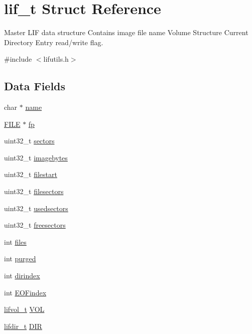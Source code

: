 \hypertarget{structlif__t}{}\section{lif\+\_\+t Struct Reference}
\label{structlif__t}


Master L\+IF data structure Contains image file name Volume Structure Current Directory Entry read/write flag.  




{\ttfamily \#include $<$lifutils.\+h$>$}

\subsection*{Data Fields}
\begin{DoxyCompactItemize}
\item 
char $\ast$ \hyperlink{structlif__t_ae6b943f3c26005fc375169960e9049f7}{name}
\item 
\hyperlink{posix_8h_aed4dabeb9f7c518ded42f930a04abce8}{F\+I\+LE} $\ast$ \hyperlink{structlif__t_ad679ba16ca21371a649981a4cca9e64c}{fp}
\item 
uint32\+\_\+t \hyperlink{structlif__t_a262b14d8547abff49d9dd1b445faf6d5}{sectors}
\item 
uint32\+\_\+t \hyperlink{structlif__t_afabd64e66adb03eef2249b6c627faac7}{imagebytes}
\item 
uint32\+\_\+t \hyperlink{structlif__t_a3c1bcc66b694d07ebc304ef7cb66b4ef}{filestart}
\item 
uint32\+\_\+t \hyperlink{structlif__t_a1223702cce63f879654d51773243643d}{filesectors}
\item 
uint32\+\_\+t \hyperlink{structlif__t_ad81767a2f65b997d5abecba130b89814}{usedsectors}
\item 
uint32\+\_\+t \hyperlink{structlif__t_a1fc11461eb5643d84e229772f7623152}{freesectors}
\item 
int \hyperlink{structlif__t_aceca398e2e3f6bcffe1593969544d546}{files}
\item 
int \hyperlink{structlif__t_a1dfef3ca99d6ba9680bb9b6bf8fafc32}{purged}
\item 
int \hyperlink{structlif__t_a74f8af3dc203c3c6b9dea3829bb4b6fa}{dirindex}
\item 
int \hyperlink{structlif__t_a68c465a879c7d4bd2279682185b6250e}{E\+O\+Findex}
\item 
\hyperlink{structlifvol__t}{lifvol\+\_\+t} \hyperlink{structlif__t_ae68126d2b9261ef9a6903a95d5c82cac}{V\+OL}
\item 
\hyperlink{structlifdir__t}{lifdir\+\_\+t} \hyperlink{structlif__t_aefeaa526c04a2b8715b0392feeec52a3}{D\+IR}
\end{DoxyCompactItemize}


